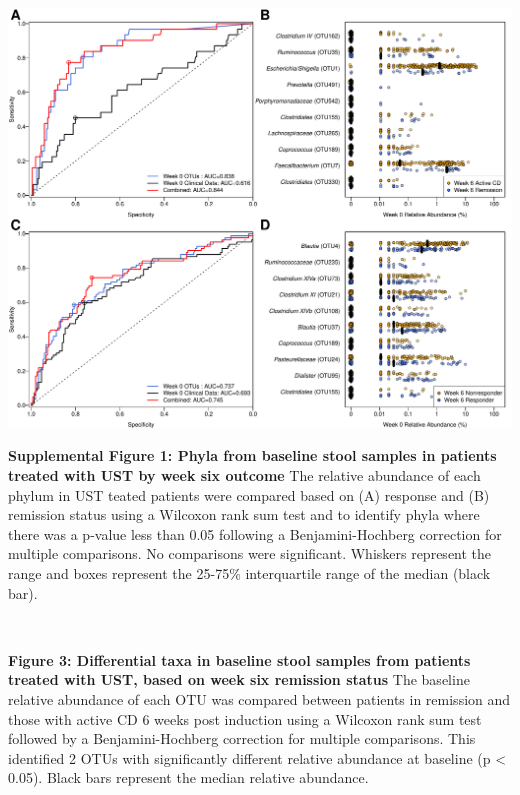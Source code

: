 \documentclass[12pt,]{article}
\begin{document}
\includegraphics{figures/Figure2_wk0Xwk6pred.pdf}

\newpage

\textbf{Supplemental Figure 1: Phyla from baseline stool samples in
patients treated with UST by week six outcome} The relative abundance of
each phylum in UST teated patients were compared based on (A) response
and (B) remission status using a Wilcoxon rank sum test and to identify
phyla where there was a p-value less than 0.05 following a
Benjamini-Hochberg correction for multiple comparisons. No comparisons
were significant. Whiskers represent the range and boxes represent the
25-75\% interquartile range of the median (black bar).

\includegraphics{figures/SF1_wk6phyla.pdf}

\newpage

\textbf{Figure 3: Differential taxa in baseline stool samples from
patients treated with UST, based on week six remission status} The
baseline relative abundance of each OTU was compared between patients in
remission and those with active CD 6 weeks post induction using a
Wilcoxon rank sum test followed by a Benjamini-Hochberg correction for
multiple comparisons. This identified 2 OTUs with significantly
different relative abundance at baseline (p \textless{} 0.05). Black
bars represent the median relative abundance.
\end{document}
